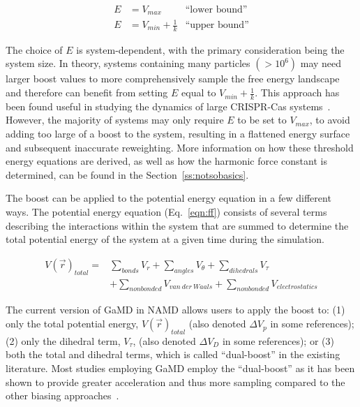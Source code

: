 \documentclass[9pt,tutorial,pubversion]{livecoms}
\begin{document}
\begin{equation} 
    \begin{aligned}
    E & = V_{max} & \text{``lower bound''} \\
    E & = V_{min} + \frac{1}{k} & \text{``upper bound''}
    \end{aligned}
    \label{eqn:threshold}
\end{equation}

\bigskip

The choice of $E$ is system-dependent, with the primary consideration being the system size. In theory, systems containing many particles $\left(> 10^{6}\right)$ may need larger boost values to more comprehensively sample the free energy landscape and therefore can benefit from setting $E$ equal to $V_{min} + \frac{1}{k}$. This approach has been found useful in studying the dynamics of large CRISPR-Cas systems~\cite{wang_gaussian_2021}. However, the majority of systems may only require $E$ to be set to $V_{max}$, to avoid adding too large of a boost to the system, resulting in a flattened energy surface and subsequent inaccurate reweighting. More information on how these threshold energy equations are derived, as well as how the harmonic force constant is determined, can be found in the Section~\ref{ss:notsobasics}. 

The boost can be applied to the potential energy equation in a few different ways. The potential energy equation (Eq.~\ref{eqn:ff}) consists of several terms describing the interactions within the system that are summed to determine the total potential energy of the system at a given time during the simulation.

\begin{equation}  
    \begin{aligned}
    V\left(\vec{r}\right)_{total} =
    & \sum\limits_{bonds} V_{r} + \sum\limits_{angles} V_{\theta} + \sum\limits_{dihedrals} V_{\tau} \\
    & + \sum\limits_{nonbonded} V_{van~der~Waals} + 
    \sum\limits_{nonbonded} V_{electrostatics}
    \end{aligned}
    \label{eqn:ff}
\end{equation}

\bigskip

The current version of GaMD in NAMD allows users to apply the boost to: (1) only the total potential energy, $V\left(\vec{r}\right)_{total}$ (also denoted $\Delta{V_{p}}$ in some references); (2) only the dihedral term, $V_{\tau}$, (also denoted $\Delta{V_{D}}$ in some references); or (3) both the total and dihedral terms, which is called ``dual-boost'' in the existing literature. Most studies employing GaMD employ the ``dual-boost'' as it has been shown to provide greater acceleration and thus more sampling compared to the other biasing approaches~\cite{hamelberg_sampling_2007}.
\end{document}
